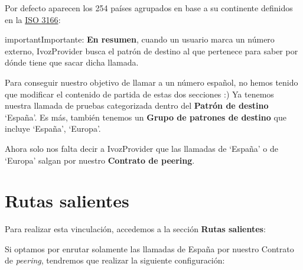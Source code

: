 \documentclass[letterpaper,10pt,spanish]{sphinxmanual}
\begin{document}

Por defecto aparecen los 254 países agrupados en base a su continente definidos en la \href{https://es.wikipedia.org/wiki/ISO\_3166}{ISO 3166}:


\begin{notice}{important}{Importante:}
\textbf{En resumen}, cuando un usuario marca un número externo, IvozProvider busca el patrón de destino al que pertenece para saber por dónde tiene que sacar dicha llamada.
\end{notice}

Para conseguir nuestro objetivo de llamar a un número español, no hemos tenido que modificar el contenido de partida de estas dos secciones :)
\label{external_outgoing_calls/call_routing:outgoing-routes}
Ya tenemos nuestra llamada de pruebas categorizada dentro del \textbf{Patrón de destino} `España'. Es más, también tenemos un \textbf{Grupo de patrones de destino} que incluye `España', `Europa'.

Ahora solo nos falta decir a IvozProvider que las llamadas de `España' o de `Europa' salgan por nuestro \textbf{Contrato de peering}.


\section{Rutas salientes}
\label{external_outgoing_calls/call_routing::doc}\label{external_outgoing_calls/call_routing:outgoing-routing}
Para realizar esta vinculación, accedemos a la sección \textbf{Rutas salientes}:


Si optamos por enrutar solamente las llamadas de España por nuestro Contrato de \emph{peering}, tendremos que realizar la siguiente configuración:

\end{document}
